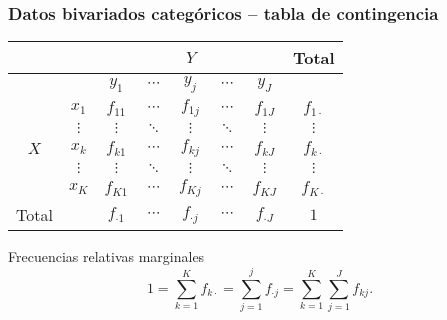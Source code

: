 \documentclass[table]{beamer}
\begin{document}
\begin{frame}
    \frametitle{Datos bivariados categóricos -- tabla de contingencia}
    \begin{center}
        \begin{tabular}{c|c|ccccc|c}
            & & \multicolumn{5}{c|}{$Y$} & Total \\
            \hline
            & & $y_{1}$ & $\cdots$ & $y_{j}$ & $\cdots$ & $y_{J}$ & \\
            \hline
            & $x_{1}$ & $f_{11}$ & $\cdots$ & $f_{1j}$ & $\cdots$ & $f_{1J}$ & $f_{1 \cdot}$ \\
             & $\vdots$ & $\vdots$ & $\ddots$ & $\vdots$ & $\ddots$ & $\vdots$ & $\vdots$ \\
            $X$ & $x_{k}$ & $f_{k1}$ & $\cdots$ & $f_{kj}$ & $\cdots$ & $f_{kJ}$ & $f_{k \cdot}$ \\
             & $\vdots$ & $\vdots$ & $\ddots$ & $\vdots$ & $\ddots$ & $\vdots$ & $\vdots$ \\
            & $x_{K}$ & $f_{K1}$ & $\cdots$ & $f_{Kj}$ & $\cdots$ & $f_{KJ}$ & $f_{K \cdot}$ \\
            \hline
            Total & & $f_{\cdot 1}$ & $\cdots$ & $f_{\cdot j}$ & $\cdots$ & $f_{\cdot J}$ & $1$ \\
        \end{tabular}
    \end{center}
    \begin{block}{Frecuencias relativas marginales}
        \begin{equation*}
            1 = \sum_{k = 1}^{K} f_{k \cdot} = \sum_{j = 1}^{j} f_{\cdot j} = \sum_{k = 1}^{K} \sum_{j = 1}^{J} f_{k j} .
        \end{equation*}
    \end{block}
\end{frame}
\end{document}
